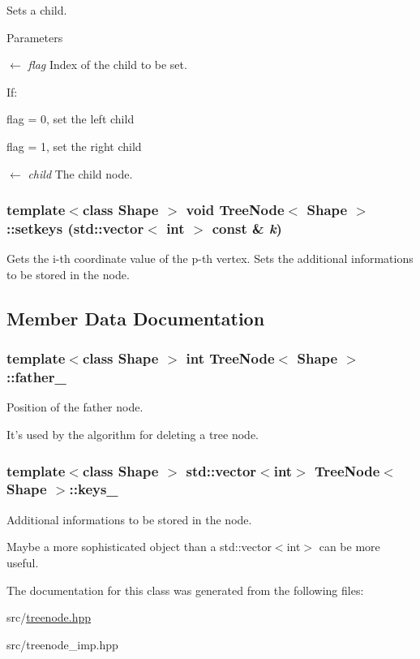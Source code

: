 Sets a child. 
\begin{DoxyParams}{Parameters}
\item[\mbox{$\leftarrow$} {\em flag}]Index of the child to be set. \par
 If: 
\begin{DoxyItemize}
\item flag = 0, set the left child 
\item flag = 1, set the right child 
\end{DoxyItemize}\item[\mbox{$\leftarrow$} {\em child}]The child node. \end{DoxyParams}
\hypertarget{classTreeNode_a18c8b24477006cf279fcb5b08fc8b65d}{
\subsubsection[{setkeys}]{\setlength{\rightskip}{0pt plus 5cm}template$<$class Shape $>$ void {\bf TreeNode}$<$ Shape $>$::setkeys (std::vector$<$ int $>$ const \& {\em k})}}
\label{classTreeNode_a18c8b24477006cf279fcb5b08fc8b65d}


Gets the i-\/th coordinate value of the p-\/th vertex. Sets the additional informations to be stored in the node. 

\subsection{Member Data Documentation}
\hypertarget{classTreeNode_a95f8421119daf2730df4905bd97f697d}{
\subsubsection[{father\_\-}]{\setlength{\rightskip}{0pt plus 5cm}template$<$class Shape $>$ int {\bf TreeNode}$<$ Shape $>$::{\bf father\_\-}}}
\label{classTreeNode_a95f8421119daf2730df4905bd97f697d}
Position of the father node.

It's used by the algorithm for deleting a tree node. \hypertarget{classTreeNode_af184af7ec1a760f9928a9cc7a76a8395}{
\subsubsection[{keys\_\-}]{\setlength{\rightskip}{0pt plus 5cm}template$<$class Shape $>$ std::vector$<$int$>$ {\bf TreeNode}$<$ Shape $>$::{\bf keys\_\-}}}
\label{classTreeNode_af184af7ec1a760f9928a9cc7a76a8395}
Additional informations to be stored in the node.

Maybe a more sophisticated object than a std::vector$<$int$>$ can be more useful. 

The documentation for this class was generated from the following files:\begin{DoxyCompactItemize}
\item 
src/\hyperlink{treenode_8hpp}{treenode.hpp}\item 
src/treenode\_\-imp.hpp\end{DoxyCompactItemize}
